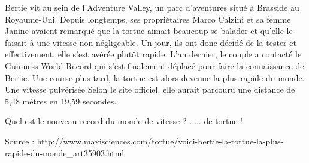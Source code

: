 
Bertie vit au sein de l'Adventure Valley, un parc d'aventures situé à Brasside au Royaume-Uni. Depuis longtemps, ses propriétaires Marco Calzini et sa femme Janine avaient remarqué que la tortue aimait beaucoup se balader et qu'elle le faisait à une vitesse non négligeable. Un jour, ils ont donc décidé de la tester et effectivement, elle s'est avérée plutôt rapide. L'an dernier, le couple a contacté le Guinness World Record qui s'est finalement déplacé pour faire la connaissance de Bertie. Une course plus tard, la tortue est alors devenue la plus rapide du monde. Une vitesse pulvérisée Selon le site officiel, elle aurait parcouru une distance de 5,48 mètres en 19,59 secondes.

Quel est le nouveau record du monde de vitesse ? ..... de tortue !

\begin{flushright}
{\scriptsize Source : http://www.maxisciences.com/tortue/voici-bertie-la-tortue-la-plus-rapide-du-monde\_art35903.html}

\end{flushright}